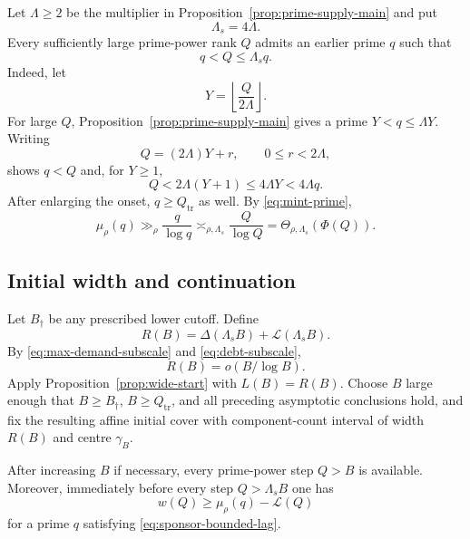 Let $\Lambda\ge2$ be the multiplier in Proposition~\ref{prop:prime-supply-main} and put
\begin{equation}\label{eq:sponsor-lag}
\Lambda_s=4\Lambda.
\end{equation}
Every sufficiently large prime-power rank $Q$ admits an earlier prime $q$ such that
\begin{equation}\label{eq:sponsor-bounded-lag}
q<Q\le\Lambda_s q.
\end{equation}
Indeed, let
\[
Y=\left\lfloor\frac{Q}{2\Lambda}\right\rfloor.
\]
For large $Q$, Proposition~\ref{prop:prime-supply-main} gives a prime $Y<q\le\Lambda Y$.  Writing
\[
Q=(2\Lambda)Y+r,
\qquad0\le r<2\Lambda,
\]
shows $q<Q$ and, for $Y\ge1$,
\[
Q<2\Lambda(Y+1)\le4\Lambda Y<4\Lambda q.
\]
After enlarging the onset, $q\ge Q_{\mathrm{tr}}$ as well.  By \eqref{eq:mint-prime},
\begin{equation}\label{eq:sponsor-mint}
\mu_\rho(q)
\gg_\rho\frac q{\log q}
\asymp_{\rho,\Lambda_s}\frac Q{\log Q}
=\Theta_{\rho,\Lambda_s}(\Phi(Q)).
\end{equation}

\subsection{Initial width and continuation}

Let $B_\dagger$ be any prescribed lower cutoff.  Define
\begin{equation}\label{eq:startup-request}
R(B)=\Delta(\Lambda_sB)+\mathcal L(\Lambda_sB).
\end{equation}
By \eqref{eq:max-demand-subscale} and \eqref{eq:debt-subscale},
\begin{equation}\label{eq:startup-subscale-scalar}
R(B)=o(B/\log B).
\end{equation}
Apply Proposition~\ref{prop:wide-start} with $L(B)=R(B)$.  Choose $B$ large enough that $B\ge B_\dagger$, $B\ge Q_{\mathrm{tr}}$, and all preceding asymptotic conclusions hold, and fix the resulting affine initial cover with component-count interval of width $R(B)$ and centre $\gamma_B$.

\begin{lemma}[Continuation]\label{lem:component-count-continuation}
After increasing $B$ if necessary, every prime-power step $Q>B$ is available.  Moreover, immediately before every step $Q>\Lambda_sB$ one has
\begin{equation}\label{eq:sponsored-width}
w(Q)\ge\mu_\rho(q)-\mathcal L(Q)
\end{equation}
for a prime $q$ satisfying \eqref{eq:sponsor-bounded-lag}.
\end{lemma}

